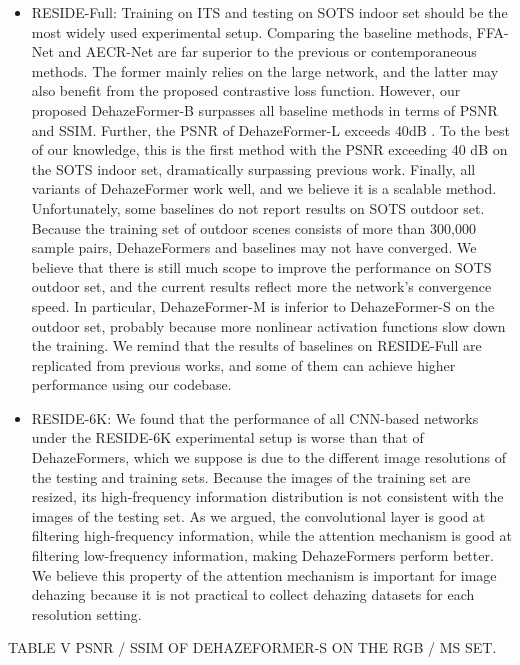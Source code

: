 \documentclass{article}
\begin{document}
\begin{itemize}
\item RESIDE-Full: Training on ITS and testing on SOTS indoor set should be the most widely used experimental setup. Comparing the baseline methods, FFA-Net and AECR-Net are far superior to the previous or contemporaneous methods. The former mainly relies on the large network, and the latter may also benefit from the proposed contrastive loss function. However, our proposed DehazeFormer-B surpasses all baseline methods in terms of PSNR and SSIM. Further, the PSNR of DehazeFormer-L exceeds $40\mathrm{dB}$ . To the best of our knowledge, this is the first method with the PSNR exceeding 40 dB on the SOTS indoor set, dramatically surpassing previous work. Finally, all variants of DehazeFormer work well, and we believe it is a scalable method. Unfortunately, some baselines do not report results on SOTS outdoor set. Because the training set of outdoor scenes consists of more than 300,000 sample pairs, DehazeFormers and baselines may not have converged. We believe that there is still much scope to improve the performance on SOTS outdoor set, and the current results reflect more the network’s convergence speed. In particular, DehazeFormer-M is inferior to DehazeFormer-S on the outdoor set, probably because more nonlinear activation functions slow down the training. We remind that the results of baselines on RESIDE-Full are replicated from previous works, and some of them can achieve higher performance using our codebase.


\item RESIDE-6K: We found that the performance of all CNN-based networks under the RESIDE-6K experimental setup is worse than that of DehazeFormers, which we suppose is due to the different image resolutions of the testing and training sets. Because the images of the training set are resized, its high-frequency information distribution is not consistent with the images of the testing set. As we argued, the convolutional layer is good at filtering high-frequency information, while the attention mechanism is good at filtering low-frequency information, making DehazeFormers perform better. We believe this property of the attention mechanism is important for image dehazing because it is not practical to collect dehazing datasets for each resolution setting.


\end{itemize}

TABLE V PSNR / SSIM OF DEHAZEFORMER-S ON THE RGB / MS SET.
\end{document}
